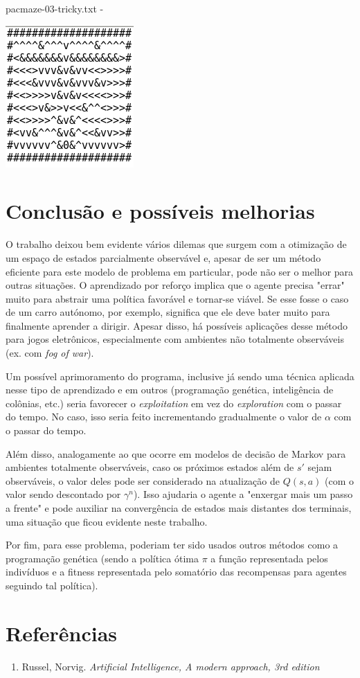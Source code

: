 \documentclass[11pt]{article}
\begin{document}
pacmaze-03-tricky.txt -

\includegraphics[scale=.5]{tst3-100k.png}

\section{Conclusão e possíveis melhorias}

O trabalho deixou bem evidente vários dilemas que surgem com a otimização de um espaço de estados parcialmente observável e, apesar de ser um método eficiente para este modelo de problema em particular, pode não ser o melhor para outras situações. O aprendizado por reforço implica que o agente precisa "errar" muito para abstrair uma política favorável e tornar-se viável. Se esse fosse o caso de um carro autónomo, por exemplo, significa que ele deve bater muito para finalmente aprender a dirigir. Apesar disso, há possíveis aplicações desse método para jogos eletrônicos, especialmente com ambientes não totalmente observáveis (ex. com \textit{fog of war}).

Um possível aprimoramento do programa, inclusive já sendo uma técnica aplicada nesse tipo de aprendizado e em outros (programação genética, inteligência de colônias, etc.) seria favorecer o \textit{exploitation} em vez do \textit{exploration} com o passar do tempo. No caso, isso seria feito incrementando gradualmente o valor de $\alpha$ com o passar do tempo.

Além disso, analogamente ao que ocorre em modelos de decisão de Markov para ambientes totalmente observáveis, caso os próximos estados além de $s'$ sejam observáveis, o valor deles pode ser considerado na atualização de $Q(s, a)$ (com o valor sendo descontado por $\gamma^n$). Isso ajudaria o agente a "enxergar mais um passo a frente" e pode auxiliar na convergência de estados mais distantes dos terminais, uma situação que ficou evidente neste trabalho.

Por fim, para esse problema, poderiam ter sido usados outros métodos como a programação genética (sendo a política ótima $\pi$ a função representada pelos indivíduos e a fitness representada pelo somatório das recompensas para agentes seguindo tal política).

\section{Referências}

\begin{enumerate}
	\item Russel, Norvig. \textit{Artificial Intelligence, A modern approach, 3rd edition}
\end{enumerate}
\end{document}
